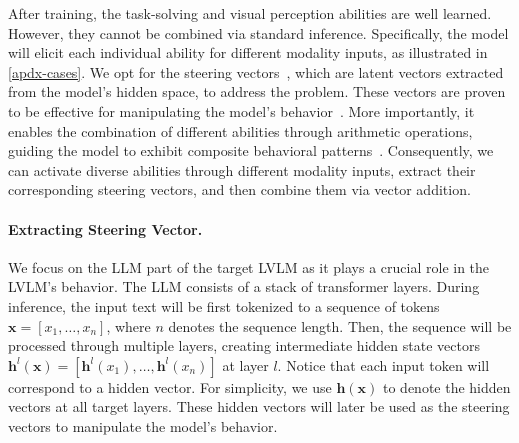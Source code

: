 After training, the task-solving and visual perception abilities are well learned. However, they cannot be combined via standard inference. Specifically, the model will elicit each individual ability for different modality inputs, as illustrated in \autoref{apdx-cases}. We opt for the steering vectors~\cite{subramani2022extracting,turner2023activation}, which are latent vectors extracted from the model's hidden space, to address the problem. These vectors are proven to be effective for manipulating the model's behavior~\cite{subramani2022extracting}. More importantly, it enables the combination of different abilities through arithmetic operations, guiding the model to exhibit composite behavioral patterns~\cite{ilharco2022editing}. Consequently, we can activate diverse abilities through different modality inputs, extract their corresponding steering vectors, and then combine them via vector addition.


\paragraph{Extracting Steering Vector.} We focus on the LLM part of the target LVLM as it plays a crucial role in the LVLM's behavior. The LLM consists of a stack of transformer layers. During inference, the input text will be first tokenized to a sequence of tokens $\bm x = [x_1,\ldots,x_n ]$, where $n$ denotes the sequence length. Then, the sequence will be processed through multiple layers, creating intermediate hidden state vectors $\bm h^l(\bm x) = [\bm h^l(x_1),\ldots,\bm h^l(x_n)]$ at layer $l$. Notice that each input token will correspond to a hidden vector. For simplicity, we use $\bm h(\bm x)$ to denote the hidden vectors at all target layers. These hidden vectors will later be used as the steering vectors to manipulate the model's behavior.


